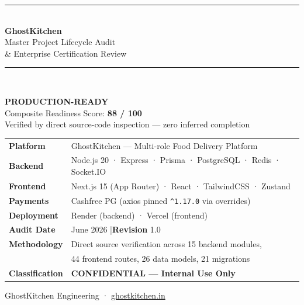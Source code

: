 \documentclass[11pt,a4paper]{article}
\begin{document}
\begin{titlepage}
  \centering
  \vspace*{1.5cm}
  {\color{brand}\rule{\linewidth}{5pt}}\\[0.5cm]
  {\Huge\bfseries GhostKitchen}\\[0.3cm]
  {\LARGE\color{dark} Master Project Lifecycle Audit}\\[0.15cm]
  {\large\color{muted} \& Enterprise Certification Review}\\[0.4cm]
  {\color{brand}\rule{\linewidth}{5pt}}\\[1.5cm]

  \begin{tcolorbox}[colback=brand!6,colframe=brand,width=0.95\textwidth,
    title=\textbf{\large Certification Verdict},fonttitle=\bfseries]
    \centering\vspace{2pt}
    {\Large\bfseries\color{ok} PRODUCTION-READY \quad\faCheckCircle}\\[6pt]
    {\large Composite Readiness Score: \textbf{88 / 100}}\\[4pt]
    {\small Verified by direct source-code inspection — zero inferred completion}
  \end{tcolorbox}

  \vspace{1cm}
  \begin{tabular}{ll}
    \textbf{Platform}        & GhostKitchen — Multi-role Food Delivery Platform \\[3pt]
    \textbf{Backend}         & Node.js 20 · Express · Prisma · PostgreSQL · Redis · Socket.IO \\[3pt]
    \textbf{Frontend}        & Next.js 15 (App Router) · React · TailwindCSS · Zustand \\[3pt]
    \textbf{Payments}        & Cashfree PG (axios pinned \texttt{\^{}1.17.0} via overrides) \\[3pt]
    \textbf{Deployment}      & Render (backend) · Vercel (frontend) \\[3pt]
    \textbf{Audit Date}      & June 2026 \quad|\quad \textbf{Revision} 1.0 \\[3pt]
    \textbf{Methodology}     & Direct source verification across 15 backend modules, \\
                             & 44 frontend routes, 26 data models, 21 migrations \\[3pt]
    \textbf{Classification}  & \textbf{\color{crit}CONFIDENTIAL — Internal Use Only} \\
  \end{tabular}

  \vfill
  {\small\color{muted}GhostKitchen Engineering · \href{https://ghostkitchen.in}{ghostkitchen.in}}
\end{titlepage}
\end{document}
